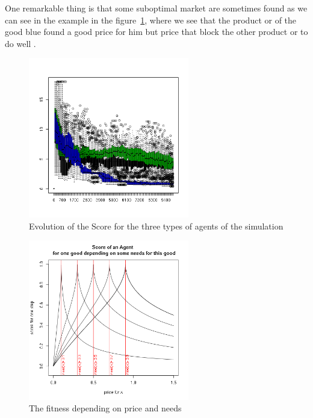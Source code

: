 \documentclass{wscpaperproc}
\begin{document}
One remarkable thing is that some suboptimal  market are sometimes found as we can see in the example in the figure~\ref{fig:suboptimal}, where we see that the product or of the good blue found a good price for him but price that block the other product or to do well .


\begin{figure}[htp]
	\begin{center}
		\includegraphics[width=7cm]{img/suboptimal.png}
	\end{center}
	\caption{Evolution of the Score for the three types of agents of the simulation}
	\label{fig:suboptimal}
\end{figure}






\begin{figure}[htp]
	\begin{center}
		\includegraphics[width=7cm]{img/fitness.png}
	\end{center}
	\caption{The fitness depending on price and needs}
	\label{fig:fit}
\end{figure}
\end{document}
